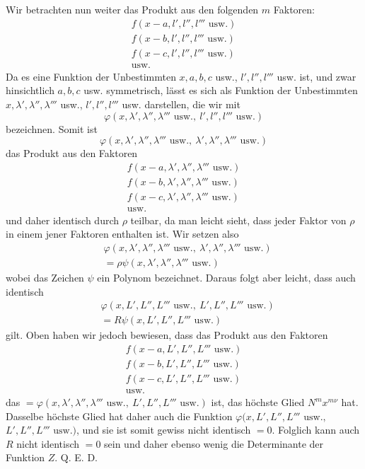 Wir betrachten nun weiter das Produkt aus den folgenden $m$ Faktoren:
\[
\begin{gathered}
f(x-a,l',l'',l'''\text{ usw.})\\
f(x-b,l',l'',l'''\text{ usw.})\\
f(x-c,l',l'',l'''\text{ usw.})\\
\text{usw.}
\end{gathered}
\]
Da es eine Funktion der Unbestimmten $x,a,b,c$ usw., $l',l'',l'''$ usw. ist, und zwar hinsichtlich $a,b,c$ usw. symmetrisch, lässt es sich als Funktion der Unbestimmten $x,\lambda',\lambda'',\lambda'''$ usw., $l',l'',l'''$ usw. darstellen, die wir mit
\[
\varphi(x,\lambda',\lambda'',\lambda'''\text{ usw.},\ l',l'',l'''\text{ usw.})
\]
bezeichnen. Somit ist
\[
\varphi(x,\lambda',\lambda'',\lambda'''\text{ usw.},\ \lambda',\lambda'',\lambda'''\text{ usw.})
\]
das Produkt aus den Faktoren
\[
\begin{gathered}
f(x-a,\lambda',\lambda'',\lambda'''\text{ usw.})\\
f(x-b,\lambda',\lambda'',\lambda'''\text{ usw.})\\
f(x-c,\lambda',\lambda'',\lambda'''\text{ usw.})\\
\text{usw.}
\end{gathered}
\]
und daher identisch durch $\rho$ teilbar, da man leicht sieht, dass jeder Faktor von $\rho$ in einem jener Faktoren enthalten ist. Wir setzen also
\[
\begin{aligned}
&\varphi(x,\lambda',\lambda'',\lambda'''\text{ usw.},\ \lambda',\lambda'',\lambda'''\text{ usw.})\\
&=\rho\psi(x,\lambda',\lambda'',\lambda'''\text{ usw.})
\end{aligned}
\]
wobei das Zeichen $\psi$ ein Polynom bezeichnet. Daraus folgt aber leicht, dass auch identisch
\[
\begin{aligned}
&\varphi(x,\allowbreak L',\allowbreak L'',\allowbreak L'''\text{ usw.},\allowbreak \ L',\allowbreak L'',\allowbreak L'''\text{ usw.})\\
&=R\psi(x,L',L'',L'''\text{ usw.})
\end{aligned}
\]
gilt. Oben haben wir jedoch bewiesen, dass das Produkt aus den Faktoren
\[
\begin{gathered}
f(x-a,L',L'',L'''\text{ usw.})\\
f(x-b,L',L'',L'''\text{ usw.})\\
f(x-c,L',L'',L'''\text{ usw.})\\
\text{usw.}
\end{gathered}
\]
das $=\varphi(x,\lambda',\lambda'',\lambda'''\text{ usw.},\ L',L'',L'''\text{ usw.})$ ist, das höchste Glied $N^mx^{m\nu}$ hat. Dasselbe höchste Glied hat daher auch die Funktion $\varphi(x,\allowbreak L',\allowbreak L'',\allowbreak L'''\text{ usw.},\allowbreak $
$L',L'',L'''\text{ usw.})$, und sie ist somit gewiss nicht identisch $=0$. Folglich kann auch $R$ nicht identisch $=0$ sein und daher ebenso wenig die Determinante der Funktion $Z$. Q. E. D.


